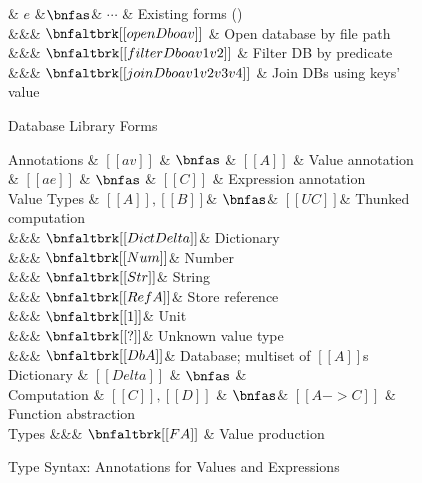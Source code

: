\begin{figure}
  \begin{grammar}
  & $e$
    &$\bnfas$& $\cdots$ & Existing forms ()
    \\ &&& $\bnfaltbrk [[ openDb oa v ]]$ & Open database by file path
    \\ &&& $\bnfaltbrk [[ filterDb oa v1 v2 ]]$ & Filter DB by predicate
    \\ &&& $\bnfaltbrk [[ joinDb oa v1 v2 v3 v4 ]]$ & Join DBs using keys' value
\end{grammar}
\caption{Database Library Forms}
\label{fig:db-syntax}
\end{figure}


\begin{figure}
\begin{grammar}
  Annotations
    & $[[av]]$ & $\bnfas$ & $[[A]]$ & Value annotation
  \\
    & $[[ae]]$ & $\bnfas$ & $[[C]]$ & Expression annotation
  \\
  Value Types  & $[[A]], [[B]]$& $\bnfas$& 
  $ [[U C]]$& Thunked computation
  \\ &&& $\bnfaltbrk [[Dict Delta]]$& Dictionary
  \\ &&& $\bnfaltbrk [[Num]]$& Number
  \\ &&& $\bnfaltbrk [[Str]]$& String
  \\ &&& $\bnfaltbrk [[Ref A]]$& Store reference
  \\ &&& $\bnfaltbrk [[1]]$& Unit
  \\ &&& $\bnfaltbrk [[?]]$& Unknown value type
  \\ &&& $\bnfaltbrk [[Db A]]$& Database; multiset of $[[A]]$s
  \\[2mm]
  Dictionary & $[[Delta]]$ & $\bnfas$ & 
  \\[2mm]
  Computation & $[[C]], [[D]]$ & $\bnfas$& 
  $[[A -> C]]$ & Function abstraction
  \\ 
  Types
  &&& $\bnfaltbrk [[F A]]$ & Value production
\end{grammar}
\caption{Type Syntax: Annotations for Values and Expressions}
\label{fig:types}
\end{figure}


